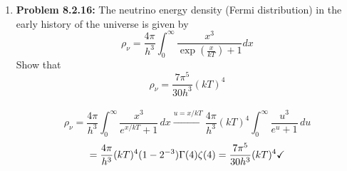 \documentclass{article}
\begin{document}
\begin{enumerate}
    $N$ being the total number of particles. The average or expectation value of $v^n$ is defined as $\langle v^n \rangle = N^{-1} \int_{}^{}v^ndN$. Show that
    \[\langle v^n \rangle = \left( \frac{2kT}{m}\right)^{n/2} \frac{\Gamma(\frac{n+3}{2})}{\Gamma(\frac{3}{2})}\]
    \\
    \[
        \langle v^n \rangle 
        = 4\pi\left(\frac{m}{2\pi kT}\right)^{3/2} \int_0^\infty v^{n+2}\, e^{-mv^2/2kT}\, dv
    \]
    \[t = \dfrac{mv^2}{2kT}, v = \left(\dfrac{2kT}{m}\right)^{1/2} t^{1/2}, 
    dv = \dfrac{1}{2}\left(\dfrac{2kT}{m}\right)^{1/2} t^{-1/2}\,dt,
    v^{n+2} = \left(\dfrac{2kT}{m}\right)^{(n+2)/2} t^{(n+2)/2}\]
    \[
        \int_0^\infty v^{n+2} e^{-mv^2/2kT}\,dv 
        = \frac{1}{2}\left(\frac{2kT}{m}\right)^{(n+3)/2}
          \int_0^\infty t^{\frac{n+3}{2}-1} e^{-t}\,dt 
        = \frac{1}{2}\left(\frac{2kT}{m}\right)^{(n+3)/2}\Gamma\!\left(\frac{n+3}{2}\right)
        \]\[\langle v^n \rangle 
        = 4\pi \left(\frac{m}{2\pi kT}\right)^{3/2} 
           \cdot \frac{1}{2}\left(\frac{2kT}{m}\right)^{(n+3)/2}
           \Gamma\!\left(\frac{n+3}{2}\right) \\
        = \frac{2}{\sqrt{\pi}}\left(\frac{2kT}{m}\right)^{n/2}
           \Gamma\!\left(\frac{n+3}{2}\right)\]\[
        \therefore \hspace{1mm}\langle v^n \rangle 
        = \left(\frac{2kT}{m}\right)^{n/2}
          \frac{\Gamma\!\left(\frac{n+3}{2}\right)}{\Gamma\!\left(\frac{3}{2}\right)} 
        \qquad \checkmark
    \]

    \item \textbf{Problem 8.2.16: } The neutrino energy density (Fermi distribution) in the early history of the universe is given by
    \[\rho_\nu = \frac{4\pi}{h^3} \int_{0}^{\infty} \frac{x^3}{\exp(\frac x{kT})+1}dx\]
    Show that
    \[\rho_\nu = \frac{7\pi^5}{30h^3}(kT)^4\]
    \\
    \[
        \rho_\nu = \frac{4\pi}{h^3}\int_0^\infty \frac{x^3}{e^{x/kT}+1}\,dx \xrightarrow{u=x/kT}\frac{4\pi}{h^3}(kT)^4 \int_0^\infty \frac{u^3}{e^u + 1}\,du
    \]
    \[ = \frac{4\pi}{h^3}(kT)^4 (1-2^{-3})\Gamma(4)\zeta(4) = \frac{7\pi^5}{30h^3}(kT)^4 \vspace{1mm} \checkmark \]
\end{enumerate}
\end{document}
